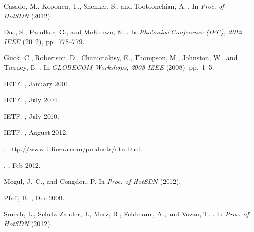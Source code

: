 \documentclass{sig-alternate-2013}
\begin{document}
\begin{thebibliography}{10}

{\sc Casado, M., Koponen, T., Shenker, S., and Tootoonchian, A.}
.
\newblock In {\em {Proc. of HotSDN}\/} (2012).

{\sc Das, S., Parulkar, G., and McKeown, N.}
.
\newblock In {\em Photonics Conference (IPC), 2012 IEEE\/} (2012),
  pp.~778--779.

{\sc Guok, C., Robertson, D., Chaniotakisy, E., Thompson, M., Johnston, W., and
  Tierney, B.}
.
\newblock In {\em GLOBECOM Workshops, 2008 IEEE\/} (2008), pp.~1--5.

\vfill\eject
{}
{\sc IETF}.
, January 2001.

{\sc IETF}.
,
  July 2004.

{\sc IETF}.
, July 2010.

{\sc IETF}.
,
  August 2012.

{}.
 http://www.infinera.com/products/dtn.html.

{}.
, Feb 2012.

{\sc Mogul, J.~C., and Congdon, P.}
\newblock In {\em {Proc. of HotSDN}\/} (2012).

{\sc Pfaff, B.}
, Dec 2009.

{\sc Suresh, L., Schulz-Zander, J., Merz, R., Feldmann, A., and Vazao, T.}
.
\newblock In {\em {Proc. of HotSDN}\/} (2012).

\end{thebibliography}
\end{document}
